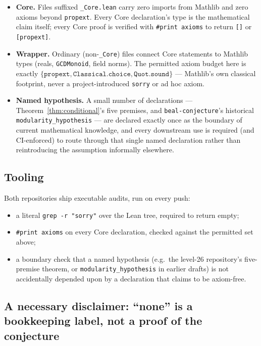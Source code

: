 \documentclass{amsart}
\begin{document}
\begin{itemize}
  \item \textbf{Core.} Files suffixed \texttt{\_Core.lean} carry zero
  imports from Mathlib and zero axioms beyond \texttt{propext}. Every
  Core declaration's type is the mathematical claim itself; every Core
  proof is verified with \texttt{\#print axioms} to return \texttt{[]}
  or \texttt{[propext]}.
  \item \textbf{Wrapper.} Ordinary (non-\texttt{\_Core}) files connect
  Core statements to Mathlib types (reals, \texttt{GCDMonoid}, field
  norms). The permitted axiom budget here is exactly
  $\{\texttt{propext}, \texttt{Classical.choice}, \texttt{Quot.sound}\}$
  — Mathlib's own classical footprint, never a project-introduced
  \texttt{sorry} or ad hoc axiom.
  \item \textbf{Named hypothesis.} A small number of declarations —
  Theorem~\ref{thm:conditional}'s five premises, and
  \texttt{beal-conjecture}'s historical \texttt{modularity\_hypothesis} —
  are declared exactly once as the boundary of current mathematical
  knowledge, and every downstream use is required (and CI-enforced) to
  route through that single named declaration rather than reintroducing
  the assumption informally elsewhere.
\end{itemize}

\subsection{Tooling}
Both repositories ship executable audits, run on every push:
\begin{itemize}
  \item a literal \texttt{grep -r "sorry"} over the Lean tree, required
  to return empty;
  \item \texttt{\#print axioms} on every Core declaration, checked against
  the permitted set above;
  \item a boundary check that a named hypothesis (e.g.\ the level-26
  repository's five-premise theorem, or \texttt{modularity\_hypothesis}
  in earlier drafts) is not accidentally depended upon by a declaration
  that claims to be axiom-free.
\end{itemize}

\subsection{A necessary disclaimer: ``none'' is a bookkeeping label, not a
proof of the conjecture}
\label{sec:disclaimer}
\end{document}
